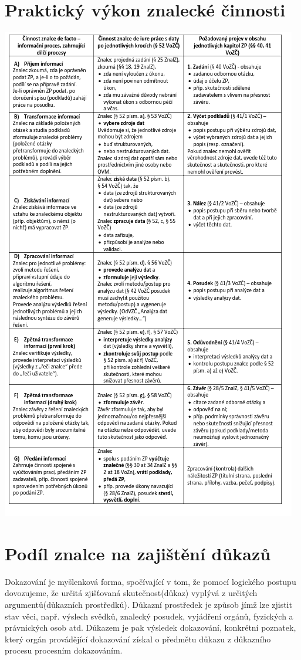 \section{Praktický výkon znalecké činnosti}
\includegraphics*[scale = 0.75]{images/vykon.png}
\section{Podíl znalce na zajištění důkazů}
Dokazování je myšlenková forma, spočívající v tom, že pomocí logického postupu dovozujeme, že určitá zjišťovaná skutečnost(důkaz) vyplývá 
z určitých argumentů(důkazních prostředků).
Důkazní prostředek je způsob jímž lze zjistit stav věci, např. výslech svědků, znalecký posudek, vyjádření orgánů, fyzických a právnických osob atd.
Důkazem je pak výsledek dokazování, konkrétní poznatek, který orgán provádějící dokazování získal o předmětu důkazu z důkazního procesu procesním dokazováním.
